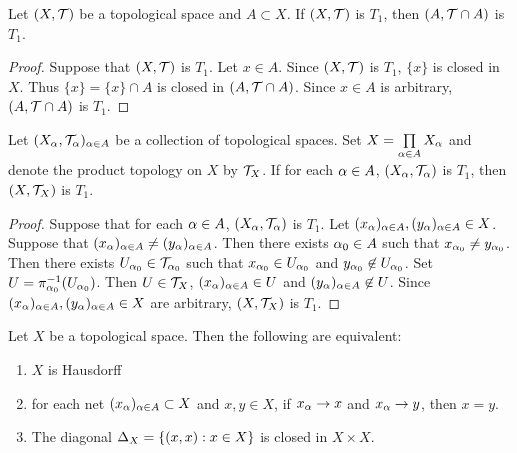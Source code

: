 \documentclass{book}
\begin{document}
	\begin{ex}
		Let $(X, \mathcal{T})$ be a topological space and $A \subset X$. If $(X, \mathcal{T})$ is $T_1$, then $(A, \mathcal{T} \cap A)$ is $T_1$.
	\end{ex}
	
	\begin{proof}
		Suppose that $(X, \mathcal{T})$ is $T_1$. Let $x \in A$. Since $(X, \mathcal{T})$ is $T_1$, $\{x\}$ is closed in $X$. Thus $\{x\} = \{x\} \cap A$ is closed in $(A, \mathcal{T} \cap A)$. Since $x \in A$ is arbitrary, $(A, \mathcal{T} \cap A)$ is $T_1$. 
	\end{proof}

	\begin{ex}
		Let $(X_{\alpha}, \mathcal{T}_{\alpha})_{\alpha \in A}$ be a collection of topological spaces. Set $X = \prod\limits_{\alpha \in A} X_{\alpha}$ and denote the product topology on $X$ by $\mathcal{T}_X$. If for each $\alpha \in A$, $(X_{\alpha}, \mathcal{T}_{\alpha})$ is $T_1$, then $(X, \mathcal{T}_X)$ is $T_1$.
	\end{ex}

	\begin{proof}
		Suppose that for each $\alpha \in A$, $(X_{\alpha}, \mathcal{T}_{\alpha})$ is $T_1$. Let $(x_{\alpha})_{\alpha \in A}, (y_{\alpha})_{\alpha \in A} \in X$. Suppose that $(x_{\alpha})_{\alpha \in A} \neq (y_{\alpha})_{\alpha \in A}$. Then there exists $\alpha_0 \in A$ such that $x_{\alpha_0} \neq y_{\alpha_0}$. Then there exists $U_{\alpha_0} \in \mathcal{T}_{\alpha_0}$ such that $x_{\alpha_0} \in U_{\alpha_0}$ and $y_{\alpha_0} \not \in U_{\alpha_0}$. Set $U = \pi_{\alpha_0}^{-1}(U_{\alpha_0})$. Then $U \in \mathcal{T}_X$, $(x_{\alpha})_{\alpha \in A} \in U$ and $(y_{\alpha})_{\alpha \in A} \not \in U$. Since $(x_{\alpha})_{\alpha \in A}, (y_{\alpha})_{\alpha \in A} \in X$ are arbitrary, $(X, \mathcal{T}_X)$ is $T_1$.
	\end{proof}
	
	\begin{ex}
		Let $X$ be a topological space. Then the following are equivalent: 
		\begin{enumerate}
			\item $X$ is Hausdorff
			\item for each net $(x_{\alpha})_{\alpha \in A} \subset X$ and $x,y \in X$, if $x_{\alpha} \rightarrow x$ and $x_{\alpha} \rightarrow y$, then $x = y$.
			\item The diagonal $\Delta_X = \{(x,x):x \in X\}$ is closed in $X \times X$.
		\end{enumerate} 
	\end{ex}
	
\end{document}
